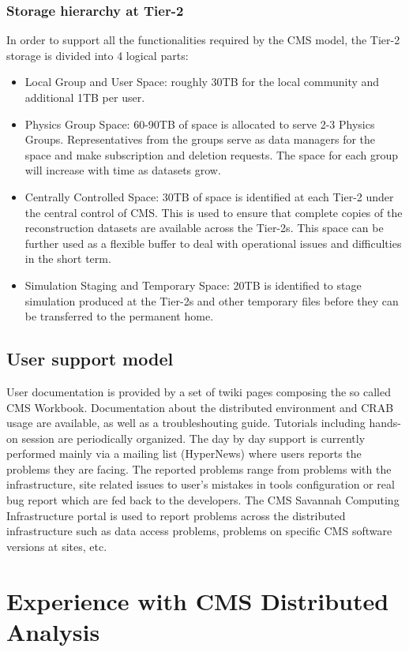 \subsubsection{Storage hierarchy at Tier-2}
In order to support all the functionalities required by the CMS model, the Tier-2 storage is divided into 4 logical parts:
\begin{itemize}
\item{} Local Group and User Space: roughly 30TB for the local community and additional 1TB per user.
\item{} Physics Group Space: 60-90TB of space is allocated to serve 2-3 Physics Groups. Representatives from the groups serve as data managers for the space and make subscription and deletion requests.
The space for each group will increase with time as datasets grow.
\item{} Centrally Controlled Space: 30TB of space is identified at each Tier-2 under the central control of CMS.
This is used to ensure that complete copies of the reconstruction datasets are available across the Tier-2s. This space can be further used as a flexible buffer to deal with operational issues and difficulties in the short term.
\item{} Simulation Staging and Temporary Space: 20TB is identified to
stage simulation produced at the Tier-2s and other temporary
files before they can be transferred to the permanent home. 
\end{itemize}

\subsection{User support model}
\label{sec:4_4}
User documentation is provided by a set of twiki pages composing the so called CMS Workbook. Documentation about the distributed environment and CRAB usage are available, as well as a troubleshouting guide.
Tutorials including hands-on session are periodically organized.
The day by day support is currently performed mainly via a mailing list (HyperNews) where users reports the problems they are facing. The reported problems range from problems with the infrastructure, 
site related issues to user's mistakes in tools configuration or real bug report which are fed back to the developers.
The CMS Savannah Computing Infrastructure portal is used to report problems across the distributed infrastructure such as data access problems, problems on specific CMS software versions at sites, etc.

\section{Experience with CMS Distributed Analysis}
\label{sec:5}

